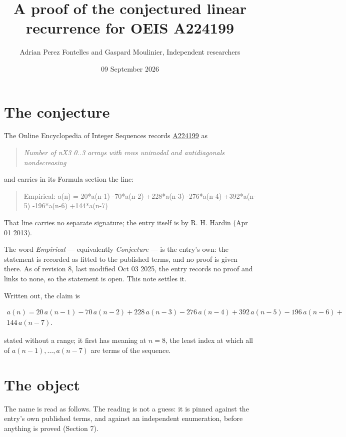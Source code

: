 \documentclass[11pt]{article}
\title{A proof of the conjectured linear recurrence for OEIS A224199}
\author{Adrian Perez Fontelles and Gaspard Moulinier, Independent researchers}
\date{09 September 2026}
\theoremstyle{definition}
\begin{document}
\maketitle
\section{The conjecture}

The Online Encyclopedia of Integer Sequences records \href{https://oeis.org/A224199}{A224199} as

\begin{quote}\itshape Number of nX3 0..3 arrays with rows unimodal and antidiagonals nondecreasing\end{quote}

and carries in its Formula section the line:

\begin{quote}\ttfamily Empirical: a(n) = 20*a(n-1) -70*a(n-2) +228*a(n-3) -276*a(n-4) +392*a(n-5) -196*a(n-6) +144*a(n-7)\end{quote}

That line carries no separate signature; the entry itself is by R. H. Hardin (Apr 01 2013).

The word {\itshape Empirical} --- equivalently {\itshape Conjecture} --- is the entry's own: the statement is recorded as fitted to the published terms, and no proof is given there. As of revision 8, last modified Oct 03 2025, the entry records no proof and links to none, so the statement is open. This note settles it.

Written out, the claim is

\begin{multline*} a(n) = 20\,a(n-1) - 70\,a(n-2) + 228\,a(n-3) - 276\,a(n-4) + 392\,a(n-5) - 196\,a(n-6) + \\ 144\,a(n-7). \end{multline*}

stated without a range; it first has meaning at $n = 8$, the least index at which all of $a(n-1),\dots,a(n-7)$ are terms of the sequence.

\section{The object}

The name is read as follows. The reading is not a guess: it is pinned against the entry's own published terms, and against an independent enumeration, before anything is proved (Section 7).
\end{document}

